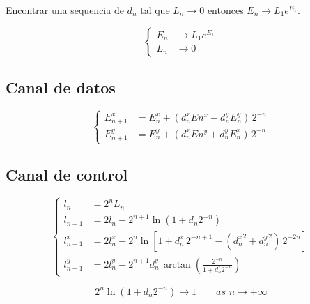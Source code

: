 \documentclass[10pt,a4paper]{book}
\begin{document}
   Encontrar una sequencia de $d_n$ tal que $L_n \rightarrow 0$ entonces $E_n \rightarrow L_1 e^{E_1}$.

\begin{equation} \label{eq:bkm_E_mode}
   \left\{
      \begin{aligned}
         E_n & \rightarrow L_1 e^{E_1} \\
         L_n & \rightarrow 0
      \end{aligned}
   \right.
\end{equation}

   \subsection{Canal de datos}
\begin{equation} \label{eq:bkm_eqs_E}
   \left\{
      \begin{aligned}
         E_{n+1}^x &= E_n^x + ( d_n^x E n^x - d_n^y E_n^y ) \,2^{-n} \\
         E_{n+1}^y &= E_n^y + ( d_n^x E n^y + d_n^y E_n^x ) \,2^{-n}
      \end{aligned}
   \right.
\end{equation}

   \subsection{Canal de control}
\begin{equation} \label{eq:bkm_eqs_l}
   \left\{
      \begin{aligned}
         l_n         &= 2^n L_n                                                                             \\
         l_{n+1}     &= 2 l_n   - 2^{n+1} \ln( 1 + d_n 2^{-n} )                                             \\
         l_{n+1}^x   &= 2 l_n^x - 2^{n}   \ln[ 1 + d_n^x \, 2^{-n+1} - ({d_n^x}^2 + {d_n^y}^2) \, 2^{-2n} ] \\
         l_{n+1}^y   &= 2 l_n^y - 2^{n+1} d_n^y \, \arctan{ \left( \frac{2^{-n}}{1+d_n^x 2^{-n}} \right) }
      \end{aligned}
   \right.
\end{equation}

\begin{equation} \label{eq:bkm_eqs_l_limit}
   2^{n} \ln( 1 + d_n 2^{-n} ) \rightarrow 1 \qquad as \,\, n \rightarrow +\infty
\end{equation}
\end{document}
